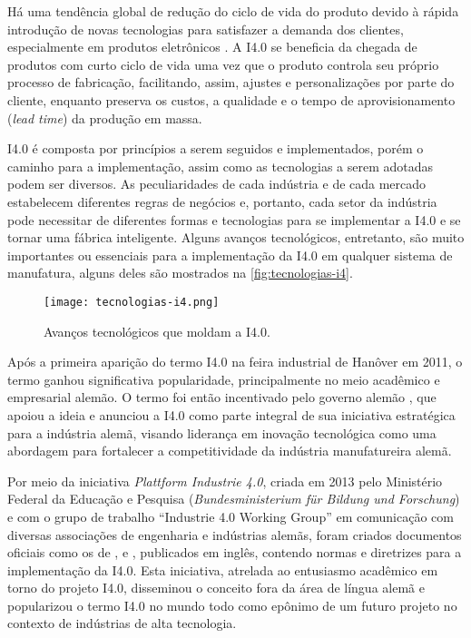 Há uma tendência global de redução do ciclo de vida do produto devido à rápida introdução de novas tecnologias para satisfazer a demanda dos clientes, especialmente em produtos eletrônicos \cite{trappey2008lifecycle}. A I4.0 se beneficia da chegada de produtos com curto ciclo de vida uma vez que o produto controla seu próprio processo de fabricação, facilitando, assim, ajustes e personalizações por parte do cliente, enquanto preserva os custos, a qualidade e o tempo de aprovisionamento (\textit{lead time}) da produção em massa.

I4.0 é composta por princípios a serem seguidos e implementados, porém o caminho para a implementação, assim como as tecnologias a serem adotadas podem ser diversos. As peculiaridades de cada indústria e de cada mercado estabelecem diferentes regras de negócios e, portanto, cada setor da indústria pode necessitar de diferentes formas e tecnologias para se implementar a I4.0 e se tornar uma fábrica inteligente. Alguns avanços tecnológicos, entretanto, são muito importantes ou essenciais para a implementação da I4.0 em qualquer sistema de manufatura, alguns deles são mostrados na \autoref{fig:tecnologias-i4}.

\begin{figure}[htb]
	\centering
	\texttt{[image: tecnologias-i4.png]}
	\caption{Avanços tecnológicos que moldam a I4.0.}
	\label{fig:tecnologias-i4}
\end{figure}

Após a primeira aparição do termo I4.0 na feira industrial de Hanôver em 2011, o termo ganhou significativa popularidade, principalmente no meio acadêmico e empresarial alemão. O termo foi então incentivado pelo governo alemão \cite{lasi2014industryfour, kagermann2013recommendations}, que apoiou a ideia e anunciou a I4.0 como parte integral de sua iniciativa estratégica para a indústria alemã, visando liderança em inovação tecnológica \cite{drath2014industrie} como uma abordagem para fortalecer a competitividade da indústria manufatureira alemã.

Por meio da iniciativa \textit{Plattform Industrie 4.0}, criada em 2013 pelo Ministério Federal da Educação e Pesquisa (\textit{Bundesministerium für Bildung und Forschung}) \cite{hartmut2019plattform} e com o grupo de trabalho ``Industrie 4.0 Working Group'' em comunicação com diversas associações de engenharia e indústrias alemãs, foram criados documentos oficiais como os de ,  e , publicados em inglês, contendo normas e diretrizes para a implementação da I4.0. Esta iniciativa, atrelada ao entusiasmo acadêmico em torno do projeto I4.0, disseminou o conceito fora da área de língua alemã e popularizou o termo I4.0 no mundo todo como epônimo de um futuro projeto no contexto de indústrias de alta tecnologia.

